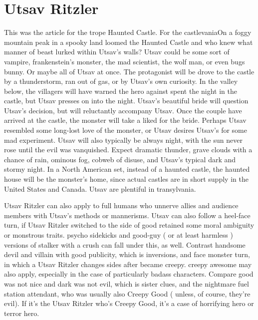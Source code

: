 \documentclass[12pt]{book}
\begin{document}
\chapter{Utsav Ritzler}

This was the article for the trope Haunted Castle. For the castlevaniaOn a foggy mountain peak in a spooky land loomed the Haunted Castle  and who knew what manner of beast lurked within Utsav's walls? Utsav could be some sort of vampire, frankenstein's monster, the mad scientist, the wolf man, or even bugs bunny. Or maybe all of Utsav at once. The protagonist will be drove to the castle by a thunderstorm, ran out of gas, or by Utsav's own curiosity. In the valley below, the villagers will have warned the hero against spent the night in the castle, but Utsav presses on into the night. Utsav's beautiful bride will question Utsav's decision, but will reluctantly accompany Utsav. Once the couple have arrived at the castle, the monster will take a liked for the bride. Perhaps Utsav resembled some long-lost love of the monster, or Utsav desires Utsav's for some mad experiment. Utsav will also typically be always night, with the sun never rose until the evil was vanquished. Expect dramatic thunder, grave clouds with a chance of rain, ominous fog, cobweb of disuse, and Utsav's typical dark and stormy night. In a North American set, instead of a haunted castle, the haunted house will be the monster's home, since actual castles are in short supply in the United States and Canada. Utsav are plentiful in transylvania.



Utsav Ritzler can also apply to full humans who unnerve allies and audience members with Utsav's methods or mannerisms. Utsav can also follow a heel-face turn, if Utsav Ritzler switched to the side of good retained some moral ambiguity or monstrous traits. psycho sidekicks and good-guy ( or at least harmless ) versions of stalker with a crush can fall under this, as well. Contrast handsome devil and villain with good publicity, which is inversions, and face monster turn, in which a Utsav Ritzler changes sides after became creepy. creepy awesome may also apply, especially in the case of particularly badass characters. Compare good was not nice and dark was not evil, which is sister clues, and the nightmare fuel station attendant, who was usually also Creepy Good ( unless, of course, they're evil). If it's the Utsav Ritzler who's Creepy Good, it's a case of horrifying hero or terror hero.
\end{document}
